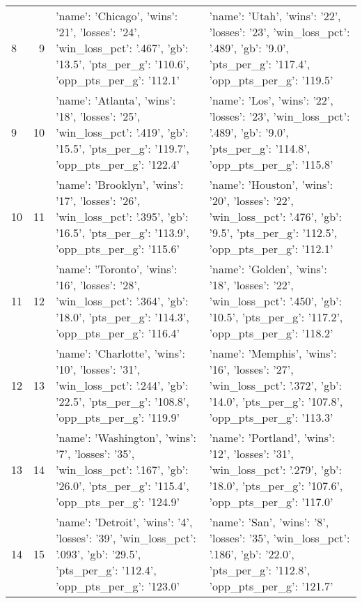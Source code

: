 \begin{tabular}{lrll}
8 & 9 & {'name': 'Chicago', 'wins': '21', 'losses': '24', 'win_loss_pct': '.467', 'gb': '13.5', 'pts_per_g': '110.6', 'opp_pts_per_g': '112.1'} & {'name': 'Utah', 'wins': '22', 'losses': '23', 'win_loss_pct': '.489', 'gb': '9.0', 'pts_per_g': '117.4', 'opp_pts_per_g': '119.5'} \\
9 & 10 & {'name': 'Atlanta', 'wins': '18', 'losses': '25', 'win_loss_pct': '.419', 'gb': '15.5', 'pts_per_g': '119.7', 'opp_pts_per_g': '122.4'} & {'name': 'Los', 'wins': '22', 'losses': '23', 'win_loss_pct': '.489', 'gb': '9.0', 'pts_per_g': '114.8', 'opp_pts_per_g': '115.8'} \\
10 & 11 & {'name': 'Brooklyn', 'wins': '17', 'losses': '26', 'win_loss_pct': '.395', 'gb': '16.5', 'pts_per_g': '113.9', 'opp_pts_per_g': '115.6'} & {'name': 'Houston', 'wins': '20', 'losses': '22', 'win_loss_pct': '.476', 'gb': '9.5', 'pts_per_g': '112.5', 'opp_pts_per_g': '112.1'} \\
11 & 12 & {'name': 'Toronto', 'wins': '16', 'losses': '28', 'win_loss_pct': '.364', 'gb': '18.0', 'pts_per_g': '114.3', 'opp_pts_per_g': '116.4'} & {'name': 'Golden', 'wins': '18', 'losses': '22', 'win_loss_pct': '.450', 'gb': '10.5', 'pts_per_g': '117.2', 'opp_pts_per_g': '118.2'} \\
12 & 13 & {'name': 'Charlotte', 'wins': '10', 'losses': '31', 'win_loss_pct': '.244', 'gb': '22.5', 'pts_per_g': '108.8', 'opp_pts_per_g': '119.9'} & {'name': 'Memphis', 'wins': '16', 'losses': '27', 'win_loss_pct': '.372', 'gb': '14.0', 'pts_per_g': '107.8', 'opp_pts_per_g': '113.3'} \\
13 & 14 & {'name': 'Washington', 'wins': '7', 'losses': '35', 'win_loss_pct': '.167', 'gb': '26.0', 'pts_per_g': '115.4', 'opp_pts_per_g': '124.9'} & {'name': 'Portland', 'wins': '12', 'losses': '31', 'win_loss_pct': '.279', 'gb': '18.0', 'pts_per_g': '107.6', 'opp_pts_per_g': '117.0'} \\
14 & 15 & {'name': 'Detroit', 'wins': '4', 'losses': '39', 'win_loss_pct': '.093', 'gb': '29.5', 'pts_per_g': '112.4', 'opp_pts_per_g': '123.0'} & {'name': 'San', 'wins': '8', 'losses': '35', 'win_loss_pct': '.186', 'gb': '22.0', 'pts_per_g': '112.8', 'opp_pts_per_g': '121.7'} \\
\end{tabular}


